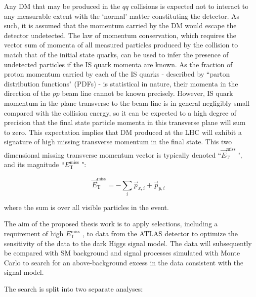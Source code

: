 \documentclass[12pt]{article}
\newcommand*{\met}{\ensuremath{E_\text{T}^\text{miss}} }
\newcommand*{\metvec}{\ensuremath{\vec{E}_\text{T}^\text{miss}} }
\begin{document}
Any DM that may be produced in the $qq$ collisions is expected not to interact to any measurable extent with the `normal' matter constituting the detector. As such, it is assumed that the momentum carried by the DM would escape the detector undetected. The law of momentum conservation, which requires the vector sum of momenta of all measured particles produced by the collision to match that of the initial state quarks, can be used to infer the presence of undetected particles if the IS quark momenta are known. As the fraction of proton momentum carried by each of the IS quarks - described by ``parton distribution functions" (PDFs) \cite{PDF_Review} - is statistical in nature, their momenta in the direction of the $pp$ beam line cannot be known precisely. However, IS quark momentum in the plane transverse to the beam line is in general negligibly small compared with the collision energy, so it can be expected to a high degree of precision that the final state particle momenta in this transverse plane will sum to zero. This expectation implies that DM produced at the LHC will exhibit a signature of high missing transverse momentum in the final state. This two dimensional missing transverse momentum vector is typically denoted ``\metvec", and its magnitude ``\met":

\begin{equation}
\metvec = -\sum_i \vec{p}_{x, i} + \vec{p}_{y, i}
\end{equation}

\noindent where the sum is over all visible particles in the event.

The aim of the proposed thesis work is to apply selections, including a requirement of high \met, to data from the ATLAS detector to optimize the sensitivity of the data to the dark Higgs signal model. The data will subsequently be compared with SM background and signal processes simulated with Monte Carlo to search for an above-background excess in the data consistent with the signal model. 

The search is split into two separate analyses:
\end{document}
